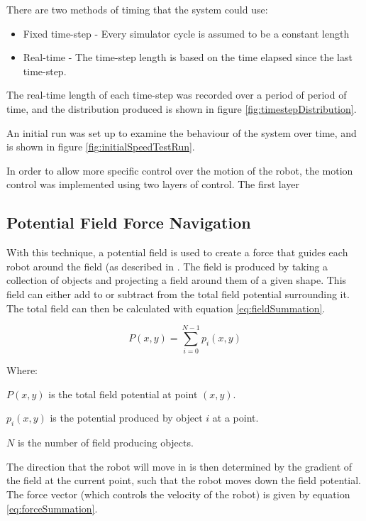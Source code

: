 \documentclass[10pt,british,english]{article}
\begin{document}
There are two methods of timing that the system could use:
\begin{itemize}
 \item Fixed time-step - Every simulator cycle is assumed to be a constant length
 \item Real-time - The time-step length is based on the time elapsed since the last time-step.
\end{itemize}

The real-time length of each time-step was recorded over a period of period of time, and the distribution produced is shown in figure \ref{fig:timestepDistribution}.

  An initial run was set up to examine the behaviour of the system over time, and is shown in figure \ref{fig:initialSpeedTestRun}.

In order to allow more specific control over the motion of the robot, the motion control was implemented using two layers of control.  The first layer

\subsection{Potential Field Force Navigation\label{sub:Potential-Field-Force}}

With this technique, a potential field is used to create a force that guides each robot around the field (as described in \cite{intelligentAlgorithmPathPlanning}. The field is produced by taking a collection of objects and projecting a field around them of a given shape. This field can either add to or subtract from the total field potential surrounding it. The total field can then be calculated with equation \ref{eq:fieldSummation}.

\begin{equation}
P(x,y)=\sum_{i=0}^{N-1}p_{i}\left(x,y\right)\label{eq:fieldSummation}
\end{equation}

Where:

$P\left(x,y\right)$ is the total field potential at point $\left(x,y\right)$.

$p_{i}\left(x,y\right)$ is the potential produced by object $i$ at a point.

$N$ is the number of field producing objects.

The direction that the robot will move in is then determined by the gradient of the field at the current point, such that the robot moves down the field potential. The force vector (which controls the velocity of the robot) is given by equation \ref{eq:forceSummation}.
\end{document}
